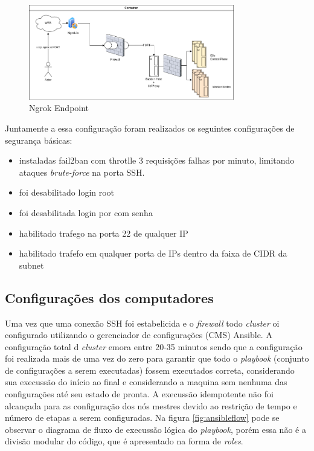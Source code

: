 \begin{figure}[!ht]
    \centering
    \includegraphics[width=0.8\textwidth]{04-figuras/ngroktcp.png}
    \caption{Ngrok Endpoint}
    \label{fig:ngroktcp}
\end{figure}

Juntamente a essa configuração foram realizados os seguintes configurações de segurança básicas:

\begin{itemize}
    \item instaladas fail2ban com throtlle 3 requisições falhas por minuto, limitando ataques \emph{brute-force} na porta SSH.
    \item foi desabilitado login root
    \item foi desabilitada login por com senha
    \item habilitado trafego na porta 22 de qualquer IP
    \item habilitado trafefo em qualquer porta de IPs dentro da faixa de CIDR da subnet
\end{itemize}



\subsection{Configurações dos computadores }
Uma vez que uma conexão SSH foi estabelicida e o \emph{firewall} todo  \emph{cluster} oi configurado utilizando o gerenciador de configurações (CMS) Ansible\textregistered. A configuração total d \emph{cluster} emora entre 20-35 minutos sendo que a configuração foi realizada mais de uma vez do zero para garantir que todo o \emph{playbook} (conjunto de configurações a serem executadas) fossem executados correta, considerando sua execussão do início ao final e considerando a maquina sem nenhuma das configurações até seu estado de pronta. A execussão idempotente não foi alcançada para as configuração dos nós mestres devido ao restrição de tempo e número de etapas a serem configuradas. Na figura \ref{fig:ansibleflow} pode se observar o diagrama de fluxo de execussão lógica do \emph{playbook}, porém essa não é a divisão modular do código, que é apresentado na forma de \emph{roles}. 

